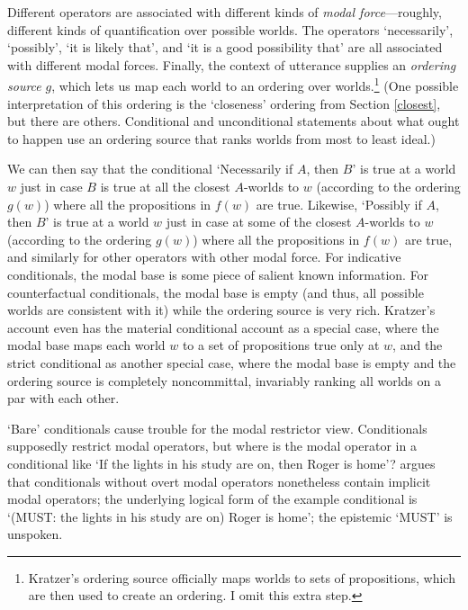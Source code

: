 Different operators are associated with different kinds of \emph{modal force}---roughly, different kinds of quantification over possible worlds.  The operators `necessarily', `possibly', `it is likely that', and `it is a good possibility that' are all associated with different modal forces.  Finally, the context of utterance supplies an \emph{ordering source} $g$, which lets us map each world to an ordering over worlds.\footnote{Kratzer's ordering source officially maps worlds to sets of propositions, which are then used to create an ordering.  I omit this extra step.}  (One possible interpretation of this ordering is the `closeness' ordering from Section \ref{closest}, but there are others.  Conditional and unconditional statements about what ought to happen use an ordering source that ranks worlds from most to least ideal.)

We can then say that the conditional `Necessarily if $A$, then $B$' is true at a world $w$ just in case $B$ is true at all the closest $A$-worlds to $w$ (according to the ordering $g(w)$) where all the propositions in $f(w)$ are true.  Likewise,  `Possibly if $A$, then $B$' is true at a world $w$ just in case at some of the closest $A$-worlds to $w$ (according to the ordering $g(w)$) where all the propositions in $f(w)$ are true, and similarly for other operators with other modal force.  For indicative conditionals, the modal base is some piece of salient known information.  For counterfactual conditionals, the modal base is empty (and thus, all possible worlds are consistent with it) while the ordering source is very rich.  Kratzer's account even has the material conditional account as a special case, where the modal base maps each world $w$ to a set of propositions true only at $w$, and the strict conditional as another special case, where the modal base is empty and the ordering source is completely noncommittal, invariably ranking all worlds on a par with each other.

`Bare' conditionals cause trouble for the modal restrictor view.  Conditionals supposedly restrict modal operators, but where is the modal operator in a conditional like `If the lights in his study are on, then Roger is home'?   \citet{kratzer-conditional-necessity, kratzer-notional-modality} argues that conditionals without overt modal operators nonetheless contain implicit modal operators; the underlying logical form of the example conditional is `(MUST: the lights in his study are on) Roger is home'; the epistemic `MUST' is unspoken.

